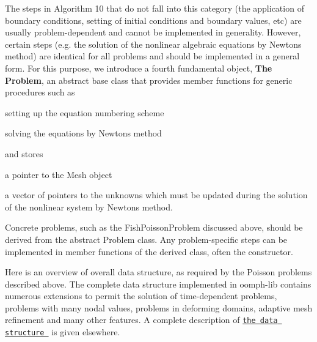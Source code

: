 \begin{DoxyItemize}
The steps in Algorithm 10 that do not fall into this category (the application of boundary conditions, setting of initial conditions and boundary values, etc) are usually problem-\/dependent and cannot be implemented in generality. However, certain steps (e.\+g. the solution of the nonlinear algebraic equations by Newton\textquotesingle{}s method) are identical for all problems and should be implemented in a general form. For this purpose, we introduce a fourth fundamental object, {\bfseries The} {\bfseries Problem}, an abstract base class that provides member functions for generic procedures such as
\begin{DoxyItemize}
\item setting up the equation numbering scheme
\item solving the equations by Newton\textquotesingle{}s method
\end{DoxyItemize}

and stores
\begin{DoxyItemize}
\item a pointer to the Mesh object
\item a vector of pointers to the unknowns which must be updated during the solution of the nonlinear system by Newton\textquotesingle{}s method.
\end{DoxyItemize}

Concrete problems, such as the {\ttfamily Fish\+Poisson\+Problem} discussed above, should be derived from the abstract {\ttfamily Problem} class. Any problem-\/specific steps can be implemented in member functions of the derived class, often the constructor.
\end{DoxyItemize}

Here is an overview of overall data structure, as required by the Poisson problems described above. The complete data structure implemented in {\ttfamily oomph-\/lib} contains numerous extensions to permit the solution of time-\/dependent problems, problems with many nodal values, problems in deforming domains, adaptive mesh refinement and many other features. A complete description of \href{../../the_data_structure/html/index.html}{\tt the data structure } is given elsewhere.

